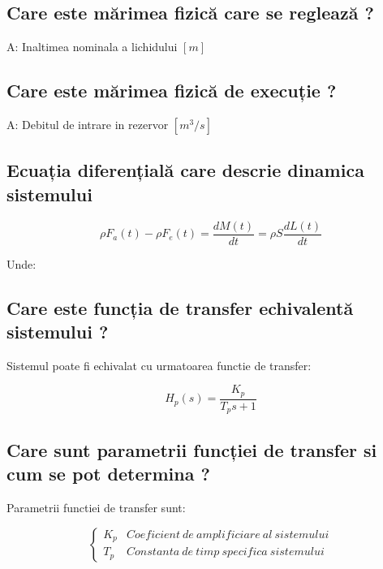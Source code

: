 \documentclass[12pt,english]{article}
\begin{document}
\subsection {Care este mărimea fizică care se reglează ?}
A: Inaltimea nominala a lichidului $[m]$

\subsection {Care este mărimea fizică de execuție ?}
A: Debitul de intrare in rezervor $[m^3/s]$

\subsection {Ecuația diferențială care descrie dinamica sistemului}
\begin{center}
  \begin{equation*}
  \rho F_{a}( t) -\rho F_{e}( t) =\dfrac{dM( t)}{dt} =\rho S\dfrac{dL( t)}{dt}
  \end{equation*}
\end{center}

Unde:


\subsection {Care este funcția de transfer echivalentă sistemului ?}
Sistemul poate fi echivalat cu urmatoarea functie de transfer:
\begin{center}
  \begin{equation*}
  H_{p}( s) =\dfrac{K_{p}}{T_{p} s+1}
  \end{equation*}
\end{center}

\subsection {Care sunt parametrii funcției de transfer si cum se pot determina ?}
Parametrii functiei de transfer sunt:
\begin{center}
  \begin{equation*}
  \begin{cases}
  K_{p} & Coeficient\ de\ amplificiare\ al\ sistemului\\
  T_{p} & Constanta\ de\ timp\ specifica\ sistemului
  \end{cases}
  \end{equation*}
\end{center}
\end{document}

